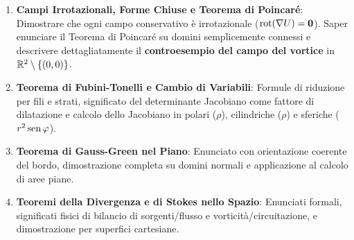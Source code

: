 \begin{esame}
\begin{enumerate}
    Dimostrare l'equivalenza logica tra: (I) $\mathbf{F} = \nabla U$; (II) indipendenza dal cammino dell'integrale curvilineo; (III) circuitazione nulla su qualsiasi curva chiusa.
    \item \textbf{Campi Irrotazionali, Forme Chiuse e Teorema di Poincaré}:
    Dimostrare che ogni campo conservativo è irrotazionale ($\operatorname{rot}(\nabla U) = \mathbf{0}$). Saper enunciare il Teorema di Poincaré su domini semplicemente connessi e descrivere dettagliatamente il \textbf{controesempio del campo del vortice} in $\mathbb{R}^2 \setminus \{(0,0)\}$.
    \item \textbf{Teorema di Fubini-Tonelli e Cambio di Variabili}:
    Formule di riduzione per fili e strati, significato del determinante Jacobiano come fattore di dilatazione e calcolo dello Jacobiano in polari ($\rho$), cilindriche ($\rho$) e sferiche ($r^2\operatorname{sen}\varphi$).
    \item \textbf{Teorema di Gauss-Green nel Piano}:
    Enunciato con orientazione coerente del bordo, dimostrazione completa su domini normali e applicazione al calcolo di aree piane.
    \item \textbf{Teoremi della Divergenza e di Stokes nello Spazio}:
    Enunciati formali, significati fisici di bilancio di sorgenti/flusso e vorticità/circuitazione, e dimostrazione per superfici cartesiane.
\end{enumerate}
\end{esame}

